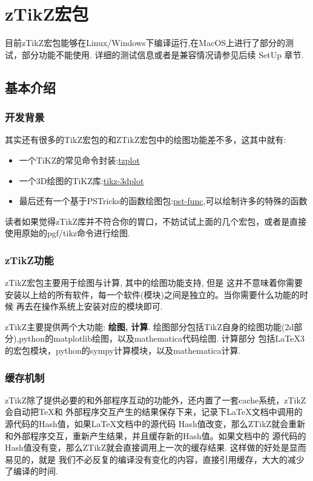 \chapter{zTikZ{}宏包}
目前zTikZ宏包能够在Linux/Windows下编译运行,在MacOS上进行了部分的测试，部分功能不能使用.
详细的测试信息或者是兼容情况请参见后续 SetUp 章节.

\section{基本介绍}
\subsection{开发背景}
其实还有很多的TikZ宏包的和ZTikZ宏包中的绘图功能差不多，这其中就有:
\begin{itemize}
    \item 一个TiKZ的常见命令封装:\href{https://ctan.org/tex-archive/graphics/pgf/contrib/tzplot}{tzplot}
    \item 一个3D绘图的TiKZ库:\href{https://ctan.org/pkg/tikz-3dplot}{tikz-3dplot}
    \item 最后还有一个基于PSTricks的函数绘图包:\href{https://ctan.org/pkg/pst-func}{pst-func},可以绘制许多的特殊的函数
\end{itemize}

读者如果觉得zTikZ库并不符合你的胃口，不妨试试上面的几个宏包，或者是直接使用原始的pgf/tikz命令进行绘图.

\subsection{zTikZ{}功能}
zTikZ宏包主要用于绘图与计算, 其中的绘图功能支持, 但是
这并不意味着你需要安装以上给的所有软件，每一个软件(模块)之间是独立的。当你需要什么功能的时候
再去在操作系统上安装对应的模块即可.

zTikZ主要提供两个大功能: \textbf{绘图, 计算}.
绘图部分包括TikZ自身的绘图功能(2d部分),python的matplotlib绘图，以及mathematica代码绘图. 计算部分
包括\LaTeX3的宏包模块，python的sympy计算模块，以及mathematica计算. 

\subsection{缓存机制}
zTikZ除了提供必要的和外部程序互动的功能外，还内置了一套cache系统，zTikZ会自动把\TeX{}和
外部程序交互产生的结果保存下来，记录下\LaTeX{}文档中调用的源代码的Hash值，如果\LaTeX{}文档中的源代码
Hash值改变，那么ZTikZ就会重新和外部程序交互，重新产生结果，并且缓存新的Hash值。如果文档中的
源代码的Hash值没有变，那么ZTikZ就会直接调用上一次的缓存结果. 这样做的好处是显而易见的，就是
我们不必反复的编译没有变化的内容，直接引用缓存，大大的减少了编译的时间. 

